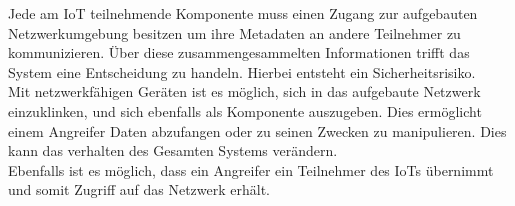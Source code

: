 Jede am \ac{IoT} teilnehmende Komponente muss einen Zugang zur aufgebauten Netzwerkumgebung besitzen um ihre Metadaten an andere Teilnehmer zu kommunizieren. Über diese zusammengesammelten Informationen trifft das System eine Entscheidung zu handeln. Hierbei entsteht ein Sicherheitsrisiko.\\
Mit netzwerkfähigen Geräten ist es möglich, sich in das aufgebaute Netzwerk einzuklinken, und sich ebenfalls als Komponente auszugeben. Dies ermöglicht einem Angreifer Daten abzufangen oder zu seinen Zwecken zu manipulieren. Dies kann das verhalten des Gesamten Systems verändern.\\
Ebenfalls ist es möglich, dass ein Angreifer ein Teilnehmer des \ac{IoT}s übernimmt und somit Zugriff auf das Netzwerk erhält.